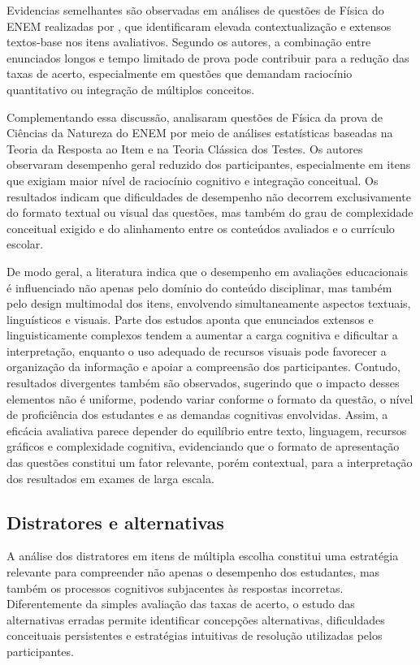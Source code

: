\documentclass[a4paper,10pt, twocolumn]{article}
\begin{document}
Evidencias semelhantes são observadas em análises de questões de Física do ENEM realizadas por \textcite{goncalves2014questoes}, que identificaram elevada contextualização e extensos textos-base nos itens avaliativos. Segundo os autores, a combinação entre enunciados longos e tempo limitado de prova pode contribuir para a redução das taxas de acerto, especialmente em questões que demandam raciocínio quantitativo ou integração de múltiplos conceitos.

Complementando essa discussão, \textcite{lopes2015estudo} analisaram questões de Física da prova de Ciências da Natureza do ENEM por meio de análises estatísticas baseadas na Teoria da Resposta ao Item e na Teoria Clássica dos Testes. Os autores observaram desempenho geral reduzido dos participantes, especialmente em itens que exigiam maior nível de raciocínio cognitivo e integração conceitual. Os resultados indicam que dificuldades de desempenho não decorrem exclusivamente do formato textual ou visual das questões, mas também do grau de complexidade conceitual exigido e do alinhamento entre os conteúdos avaliados e o currículo escolar.

De modo geral, a literatura indica que o desempenho em avaliações educacionais é influenciado não apenas pelo domínio do conteúdo disciplinar, mas também pelo design multimodal dos itens, envolvendo simultaneamente aspectos textuais, linguísticos e visuais. Parte dos estudos aponta que enunciados extensos e linguisticamente complexos tendem a aumentar a carga cognitiva e dificultar a interpretação, enquanto o uso adequado de recursos visuais pode favorecer a organização da informação e apoiar a compreensão dos participantes. Contudo, resultados divergentes também são observados, sugerindo que o impacto desses elementos não é uniforme, podendo variar conforme o formato da questão, o nível de proficiência dos estudantes e as demandas cognitivas envolvidas. Assim, a eficácia avaliativa parece depender do equilíbrio entre texto, linguagem, recursos gráficos e complexidade cognitiva, evidenciando que o formato de apresentação das questões constitui um fator relevante, porém contextual, para a interpretação dos resultados em exames de larga escala.

\subsection{Distratores e alternativas}

A análise dos distratores em itens de múltipla escolha constitui uma estratégia relevante para compreender não apenas o desempenho dos estudantes, mas também os processos cognitivos subjacentes às respostas incorretas. Diferentemente da simples avaliação das taxas de acerto, o estudo das alternativas erradas permite identificar concepções alternativas, dificuldades conceituais persistentes e estratégias intuitivas de resolução utilizadas pelos participantes.
\end{document}
